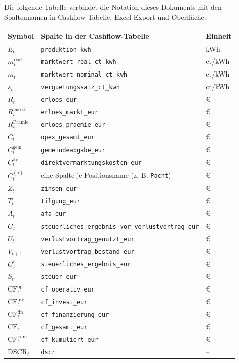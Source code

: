 \documentclass[
  a4paper,
  10pt]{article}
\begin{document}
Die folgende Tabelle verbindet die Notation dieses Dokuments mit den
Spaltennamen in Cashflow-Tabelle, Excel-Export und Oberfläche.

\begin{longtable}[]{@{}lll@{}}
\toprule\noalign{}
Symbol & Spalte in der Cashflow-Tabelle & Einheit \\
\midrule\noalign{}
\endhead
\bottomrule\noalign{}
\endlastfoot
\(E_t\) & \texttt{produktion\_kwh} & kWh \\
\(m^{\mathrm{real}}_t\) & \texttt{marktwert\_real\_ct\_kwh} & ct/kWh \\
\(m_t\) & \texttt{marktwert\_nominal\_ct\_kwh} & ct/kWh \\
\(s_t\) & \texttt{verguetungssatz\_ct\_kwh} & ct/kWh \\
\(R_t\) & \texttt{erloes\_eur} & € \\
\(R^{\mathrm{markt}}_t\) & \texttt{erloes\_markt\_eur} & € \\
\(R^{\text{Prämie}}_t\) & \texttt{erloes\_praemie\_eur} & € \\
\(C_t\) & \texttt{opex\_gesamt\_eur} & € \\
\(C^{\mathrm{gem}}_t\) & \texttt{gemeindeabgabe\_eur} & € \\
\(C^{\mathrm{dv}}_t\) & \texttt{direktvermarktungskosten\_eur} & € \\
\(C^{(j)}_t\) & eine Spalte je Positionsname (z. B. \texttt{Pacht}) &
€ \\
\(Z_t\) & \texttt{zinsen\_eur} & € \\
\(T_t\) & \texttt{tilgung\_eur} & € \\
\(A_t\) & \texttt{afa\_eur} & € \\
\(G_t\) & \texttt{steuerliches\_ergebnis\_vor\_verlustvortrag\_eur} &
€ \\
\(U_t\) & \texttt{verlustvortrag\_genutzt\_eur} & € \\
\(V_{t+1}\) & \texttt{verlustvortrag\_bestand\_eur} & € \\
\(G^{\mathrm{st}}_t\) & \texttt{steuerliches\_ergebnis\_eur} & € \\
\(S_t\) & \texttt{steuer\_eur} & € \\
\(\mathrm{CF}^{\mathrm{op}}_t\) & \texttt{cf\_operativ\_eur} & € \\
\(\mathrm{CF}^{\mathrm{inv}}_t\) & \texttt{cf\_invest\_eur} & € \\
\(\mathrm{CF}^{\mathrm{fin}}_t\) & \texttt{cf\_finanzierung\_eur} & € \\
\(\mathrm{CF}_t\) & \texttt{cf\_gesamt\_eur} & € \\
\(\mathrm{CF}^{\mathrm{kum}}_t\) & \texttt{cf\_kumuliert\_eur} & € \\
\(\mathrm{DSCR}_t\) & \texttt{dscr} & -- \\
\end{longtable}
\end{document}
